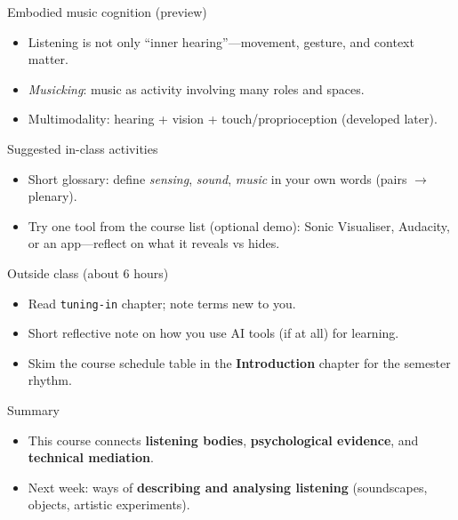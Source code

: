 \documentclass[aspectratio=169]{beamer}
\begin{document}
\begin{frame}{Embodied music cognition (preview)}
  \begin{itemize}
    \item Listening is not only ``inner hearing''—movement, gesture, and context matter.
    \item \emph{Musicking}: music as activity involving many roles and spaces.
    \item Multimodality: hearing + vision + touch/proprioception (developed later).
  \end{itemize}
\end{frame}

\begin{frame}{Suggested in-class activities}
  \begin{itemize}
    \item Short glossary: define \emph{sensing}, \emph{sound}, \emph{music} in your own words (pairs $\rightarrow$ plenary).
    \item Try one tool from the course list (optional demo): Sonic Visualiser, Audacity, or an app—reflect on what it reveals vs hides.
  \end{itemize}
\end{frame}

\begin{frame}{Outside class (about 6 hours)}
  \begin{itemize}
    \item Read \texttt{tuning-in} chapter; note terms new to you.
    \item Short reflective note on how you use AI tools (if at all) for learning.
    \item Skim the course schedule table in the \textbf{Introduction} chapter for the semester rhythm.
  \end{itemize}
\end{frame}

\begin{frame}{Summary}
  \begin{itemize}
    \item This course connects \textbf{listening bodies}, \textbf{psychological evidence}, and \textbf{technical mediation}.
    \item Next week: ways of \textbf{describing and analysing listening} (soundscapes, objects, artistic experiments).
  \end{itemize}
\end{frame}
\end{document}
